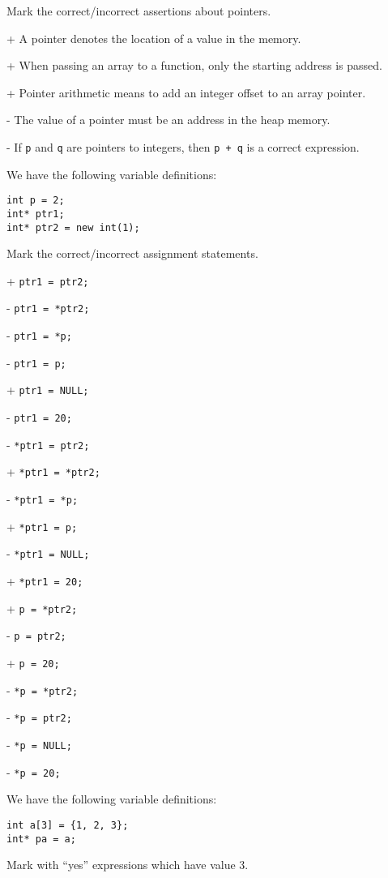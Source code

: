 \medskip
{}
Mark the correct/incorrect assertions about pointers.

+ A pointer denotes the location of a value in the memory.

+ When passing an array to a function, only the starting address is passed.

+ Pointer arithmetic means to add an integer offset to an array pointer.

- The value of a pointer must be an address in the heap memory.

- If \verb|p| and \verb|q| are pointers to integers, then \verb|p + q| is a correct expression.


\medskip
{}
We have the following variable definitions:
 \vspace{-3mm}\begin{verbatim}
int p = 2;
int* ptr1;
int* ptr2 = new int(1);
 \end{verbatim}\vspace{-6mm}
Mark the correct/incorrect assignment statements.

+ \verb|ptr1 = ptr2;|

- \verb|ptr1 = *ptr2;|

- \verb|ptr1 = *p;|

- \verb|ptr1 = p;|

+ \verb|ptr1 = NULL;|

- \verb|ptr1 = 20;|

- \verb|*ptr1 = ptr2;|

+ \verb|*ptr1 = *ptr2;|

- \verb|*ptr1 = *p;|

+ \verb|*ptr1 = p;|

- \verb|*ptr1 = NULL;|

+ \verb|*ptr1 = 20;|

+ \verb|p = *ptr2;|

- \verb|p = ptr2;|

+ \verb|p = 20;|

- \verb|*p = *ptr2;|

- \verb|*p = ptr2;|

- \verb|*p = NULL;|

- \verb|*p = 20;|


\medskip
{}
We have the following variable definitions:
 \vspace{-3mm}\begin{verbatim}
int a[3] = {1, 2, 3};
int* pa = a;
 \end{verbatim}\vspace{-6mm}
Mark with ``yes'' expressions which have value 3.


